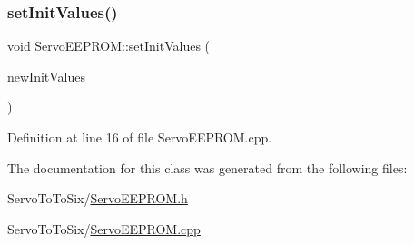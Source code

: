 \subsubsection{\texorpdfstring{set\+Init\+Values()}{setInitValues()}}
{\footnotesize\ttfamily void Servo\+E\+E\+P\+R\+O\+M\+::set\+Init\+Values (\begin{DoxyParamCaption}\item[{\hyperlink{struct_e_e_p_r_o_m__init_values}{E\+E\+P\+R\+O\+M\+\_\+init\+Values}}]{new\+Init\+Values }\end{DoxyParamCaption})}



Definition at line 16 of file Servo\+E\+E\+P\+R\+O\+M.\+cpp.



The documentation for this class was generated from the following files\+:\begin{DoxyCompactItemize}
\item 
Servo\+To\+To\+Six/\hyperlink{_servo_e_e_p_r_o_m_8h}{Servo\+E\+E\+P\+R\+O\+M.\+h}\item 
Servo\+To\+To\+Six/\hyperlink{_servo_e_e_p_r_o_m_8cpp}{Servo\+E\+E\+P\+R\+O\+M.\+cpp}\end{DoxyCompactItemize}
